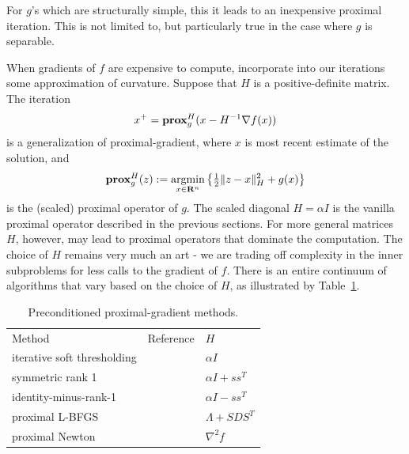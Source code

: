 For $g$'s which are structurally simple, this it leads to an
inexpensive proximal iteration. This is not limited to, but
particularly true in the case where $g$ is separable.

When gradients of $f$ are expensive to compute, incorporate into our iterations some approximation of curvature. Suppose that $H$ is a positive-definite matrix. The iteration
\begin{equation}
  \label{eq:prox-map}
  x^{+}={\bf{prox}}^H_g(x-H^{-1}\nabla f(x))
\end{equation}
is a generalization of proximal-gradient, where $x$ is most
recent estimate of the solution, and
\begin{equation}
  \label{eq:2}
  {\bf{prox}}^H_g(z):=\underset{x\in {\mathbf{R}}^n}{\text{argmin}} 
  \left\{
  \tfrac{1}{2}\|z-x\|_H^{2}+g(x) \right\}
\end{equation}
is the (scaled) proximal operator of $g$. The scaled diagonal
$H=\alpha I$ is the vanilla proximal operator described
in the previous sections. For more general matrices $H$, however,
may lead to proximal operators that dominate the computation. The
choice of $H$ remains very much an art - we are trading off complexity
in the inner subproblems for less calls to the gradient of $f$. There is an entire
continuum of algorithms that vary based on the choice of $H$, as
illustrated by Table~\ref{tab:methods}.
\begin{table}
  \caption{Preconditioned proximal-gradient methods.}
  \centering
  \begin{tabular}{l|l|l}
    Method & Reference & $H$\\
    iterative soft thresholding & \cite{beck2009fast} & $\alpha I$
    \\symmetric rank 1 & \cite{NIPS2012_4523} & $\alpha I+ss^{T}$
    \\identity-minus-rank-1 & \cite{1401.4220}  &$\alpha I-ss^T$
    \\proximal L-BFGS &\cite{schmidt2009optimizing,NIPS2014_5384,Scheinberg2016} &$\Lambda+SDS^{T}$
    \\proximal Newton &\cite{lee2014proximal,JMLR:v16:trandihn15a,Byrd2016} & $\nabla^{2}f$
  \end{tabular}
  \label{tab:methods}
\end{table}

